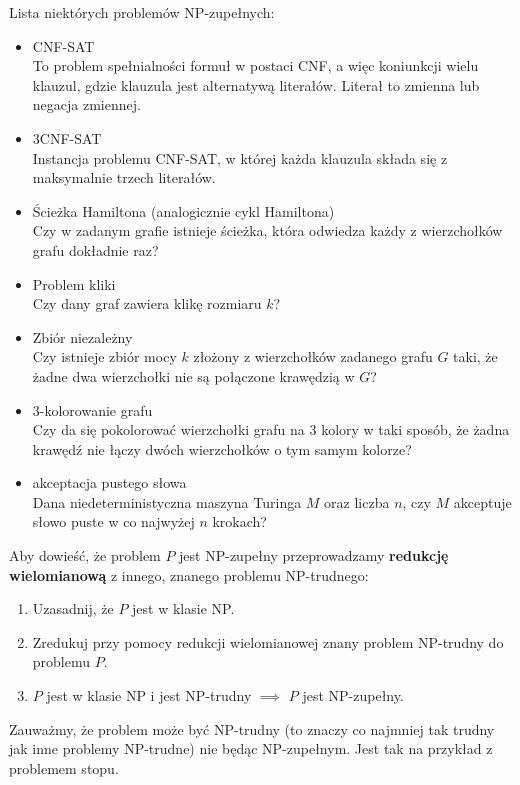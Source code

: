 Lista niektórych problemów NP-zupełnych:
\begin{itemize}
    \item CNF-SAT \\
    To problem spełnialności formuł w postaci CNF, a więc koniunkcji wielu klauzul, gdzie klauzula jest alternatywą literałów. Literał to zmienna lub negacja zmiennej.
    \item 3CNF-SAT \\
    Instancja problemu CNF-SAT, w której każda klauzula składa się z maksymalnie trzech literałów.
    \item Ścieżka Hamiltona (analogicznie cykl Hamiltona) \\
    Czy w zadanym grafie istnieje ścieżka, która odwiedza każdy z wierzchołków grafu dokładnie raz?
    \item Problem kliki \\
    Czy dany graf zawiera klikę rozmiaru $k$?
    \item Zbiór niezależny \\
    Czy istnieje zbiór mocy $k$ złożony z wierzchołków zadanego grafu $G$ taki, że żadne dwa wierzchołki nie są połączone krawędzią w $G$?
    \item 3-kolorowanie grafu \\
    Czy da się pokolorować wierzchołki grafu na 3 kolory w taki sposób, że żadna krawędź nie łączy dwóch wierzchołków o tym samym kolorze?
    \item akceptacja pustego słowa \\
    Dana niedeterministyczna maszyna Turinga $M$ oraz liczba $n$, czy $M$ akceptuje słowo puste w co najwyżej $n$ krokach?
\end{itemize}

Aby dowieść, że problem $P$ jest NP-zupełny przeprowadzamy \textbf{redukcję wielomianową} z innego, znanego problemu NP-trudnego:
\begin{enumerate}
    \item Uzasadnij, że $P$ jest w klasie NP.
    \item Zredukuj przy pomocy redukcji wielomianowej znany problem NP-trudny do problemu $P$.
    \item $P$ jest w klasie NP i jest NP-trudny $\implies$ $P$ jest NP-zupełny.
\end{enumerate}

Zauważmy, że problem może być NP-trudny (to znaczy co najmniej tak trudny jak inne problemy NP-trudne) nie będąc NP-zupełnym. Jest tak na przykład z problemem stopu.

